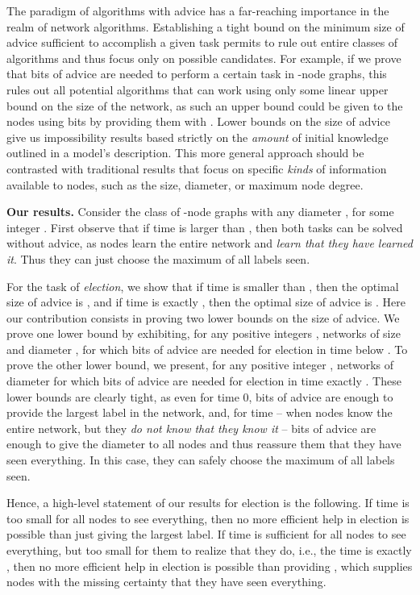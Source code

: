 \documentclass[11pt]{article}
\begin{document}
The paradigm of algorithms with advice has a far-reaching importance in the realm of network algorithms. Establishing a tight bound on the minimum size of advice sufficient to accomplish a given task permits to rule out
entire classes of algorithms and thus focus only on possible candidates. For example, if we prove that  bits of advice are needed to perform a certain task in -node graphs, this rules out all 
potential algorithms that can work using only some linear upper bound on the size of the network, as such an upper bound could be given
to the nodes using  bits by providing them with
. Lower bounds on the size of advice
give us impossibility results based strictly on the \emph{amount} of initial knowledge outlined in a model's description.
This more general approach should be contrasted with
traditional results that focus on specific \emph{kinds} of information available to nodes, such as the size, diameter, or maximum node degree. 






\noindent
{\bf Our results.} Consider the class of -node graphs with any diameter , for some integer .
First observe that if time is larger than , then both tasks can be solved without advice,
as nodes learn the entire network and {\em learn that they have learned it}. Thus they can just choose the maximum of all labels seen.



For the task of {\em election}, we show that if time is smaller than , then the optimal size of advice is ,
and if time is exactly , then the optimal size of advice is . 
Here our contribution consists in proving two lower bounds on the size of advice. We prove one lower bound by exhibiting, for any positive integers , networks of size  and diameter , for which
 bits of advice are needed for election in time below . To prove the other lower bound, we present, for any positive integer , networks of diameter 
 for which  bits of advice are needed for election in time exactly . 
These lower bounds are clearly tight, as even for time 0,  bits of advice are enough to provide the largest label in the network, and, for time  --
when nodes know the entire network, but they {\em do not know that they know it} --  bits of advice are enough to give the diameter  to all nodes and thus reassure them that they have seen everything. In this case,  they can safely choose the maximum of all labels seen.

Hence, a high-level statement of our results for election is the following. If time is too small for all nodes to see everything, then no more efficient help in election is possible
than just giving the largest label. If time is sufficient for all nodes to see everything, but too small for them to realize that they do, i.e., the time is exactly , then no more efficient help in election is possible than providing , which supplies nodes with the missing certainty that they have seen everything.
\end{document}
